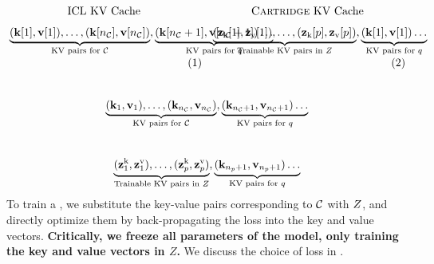{
\small
\[
\begin{minipage}{0.50\textwidth}
\centering
\text{ICL KV Cache} \vspace{-1.5em} \\
\begin{align*}
\underbrace{(\mathbf{k}[1], \mathbf{v}[1]), \dots, (\mathbf{k}[{n_\ctx}], \mathbf{v}[{n_\ctx}])}_{\text{KV pairs for~}\ctx},
\underbrace{(\mathbf{k}[{n_\ctx + 1}], \mathbf{v}[{n_\ctx + 1}])\dots}_{\text{KV pairs for } \query }
\end{align*}
\end{minipage}
\quad
\begin{minipage}{0.50\textwidth}
\centering
\text{\artifact KV Cache} \vspace{-1.5em} \\
\begin{align*}
\underbrace{(\mathbf{z}_\text{k}[1], \mathbf{z}_\text{v}[1]), \dots, (\mathbf{z}_\text{k}[p], \mathbf{z}_\text{v}[p])}_{ \text{Trainable KV pairs in }Z},
\underbrace{(\mathbf{k}[{1}], \mathbf{v}[{1}])\dots}_{\text{KV pairs for } \query }
\end{align*}
\end{minipage}
\]
}
\fi
\ifx\conference\icmlconf
{} \vspace{-1.5em} \\
\begin{align*}
\underbrace{(\mathbf{k}_1, \mathbf{v}_1), \dots, (\mathbf{k}_{n_{\mathcal{C}}}, \mathbf{v}_{n_{\mathcal{C}}})}_{\text{KV pairs for~}\mathcal{C}},
\underbrace{(\mathbf{k}_{n_{\mathcal{C}} + 1}, \mathbf{v}_{n_{\mathcal{C}} + 1})\dots}_{\text{KV pairs for } q }
\end{align*}
 \vspace{-1.5em} \\
\begin{align*}
\underbrace{(\mathbf{z}^\text{k}_1, \mathbf{z}^\text{v}_1), \dots, (\mathbf{z}^\text{k}_{p}, \mathbf{z}^\text{v}_{p})}_{\text{Trainable KV pairs in }Z},
\underbrace{(\mathbf{k}_{n_p + 1}, \mathbf{v}_{n_p + 1})\dots}_{\text{KV pairs for } q }
\end{align*}
\fi
To train a \artifact, we substitute the key-value pairs corresponding to $\mathcal{C}$ with $Z$, and directly optimize them by back-propagating the loss into the key and value vectors.
\textbf{Critically, we freeze all parameters of the model, only training the key and value vectors in $Z$.} We discuss the choice of loss in .
\vspace{-3mm}
